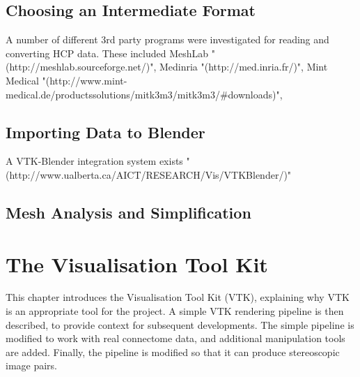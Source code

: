 \documentclass[MSc,paper=a4,pagesize=auto]{icldt}
\begin{document}
\section{Choosing an Intermediate Format}
A number of different 3rd party programs were investigated for reading and converting HCP data. These included MeshLab "(http://meshlab.sourceforge.net/)", Medinria "(http://med.inria.fr/)", Mint Medical "(http://www.mint-medical.de/productssolutions/mitk3m3/mitk3m3/#downloads)", 


\section{Importing Data to Blender}
A VTK-Blender integration system exists "(http://www.ualberta.ca/AICT/RESEARCH/Vis/VTKBlender/)" 

\section{Mesh Analysis and Simplification}

\chapter{The Visualisation Tool Kit}
This chapter introduces the Visualisation Tool Kit (VTK), explaining why VTK is an appropriate tool for the project. A simple VTK rendering pipeline is then described, to provide context for subsequent developments. The simple pipeline is modified to work with real connectome data, and additional manipulation tools are added. Finally, the pipeline is modified so that it can produce stereoscopic image pairs.
\end{document}
